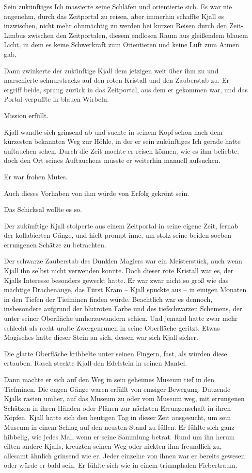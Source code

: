 Sein zukünftiges Ich massierte seine Schläfen und orientierte sich. Es war nie angenehm, durch das Zeitportal zu reisen, aber immerhin schaffte Kjall es inzwischen, nicht mehr ohnmächtig zu werden bei kurzen Reisen durch den Zeit-Limbus zwischen den Zeitportalen, diesem endlosen Raum aus gleißendem blauem Licht, in dem es keine Schwerkraft zum Orientieren und keine Luft zum Atmen gab.

Dann zwinkerte der zukünftige Kjall dem jetzigen weit über ihm zu und marschierte schnurstracks auf den roten Kristall und den Zauberstab zu. Er ergriff beide, sprang zurück in das Zeitportal, aus dem er gekommen war, und das Portal verpuffte in blauen Wirbeln.

Mission erfüllt.

Kjall wandte sich grinsend ab und suchte in seinem Kopf schon nach dem kürzesten bekannten Weg zur Höhle, in der er sein zukünftiges Ich gerade hatte auftauchen sehen. Durch die Zeit mochte er reisen können, wie es ihm beliebte, doch den Ort seines Auftauchens musste er weiterhin manuell aufsuchen.

Er war frohen Mutes.

Auch dieses Vorhaben von ihm würde von Erfolg gekrönt sein.

Das Schicksal wollte es so.






Der zukünftige Kjall stolperte aus einem Zeitportal in seine eigene Zeit, fernab der kollabierten Gänge, und hielt prompt inne, um stolz seine beiden soeben errungenen Schätze zu betrachten.

Der schwarze Zauberstab des Dunklen Magiers war ein Meisterstück, auch wenn Kjall ihn selbst nicht verwenden konnte. Doch dieser rote Kristall war es, der Kjalls Interesse besonders geweckt hatte. Er war zwar nicht so groß wie das mächtige Drachenauge, das Fürst Kram – Kjall spuckte aus – in einigen Monaten in den Tiefen der Tiefminen finden würde. Beachtlich war es dennoch, insbesondere aufgrund der blutroten Farbe und des tiefschwarzen Schemens, der unter seiner Oberfläche umherzuwandern schien. Und jemand hatte zwar mehr schlecht als recht uralte Zwergenrunen in seine Oberfläche geritzt. Etwas Magisches hatte dieser Stein an sich, dessen war sich Kjall sicher.

Die glatte Oberfläche kribbelte unter seinen Fingern, fast, als würden diese ertauben. Rasch steckte Kjall den Edelstein in seinen Mantel.

Dann machte er sich auf den Weg in sein geheimes Museum tief in den Tiefminen. Die engen Gänge waren erfüllt von emsiger Bewegung. Dutzende Kjalls rasten umher, auf das Museum zu oder vom Museum weg, mit errungenen Schätzen in ihren Händen oder Plänen zur nächsten Errungenschaft in ihren Köpfen. Kjall hatte sich den heutigen Tag in dieser Zeit ausgesucht, um sein Museum in einem Schlag auf den neusten Stand zu füllen. Er fühlte sich ganz hibbelig, wie jedes Mal, wenn er seine Sammlung betrat. Rund um ihn herum eilten andere Kjalls, kreuzten seinen Weg oder nickten ihm freundlich zu, allesamt ähnlich grinsend wie er. Jeder einzelne von ihnen war er bereits gewesen oder würde er bald sein. Er fühlte sich wie in einem triumphalen Fiebertraum.

